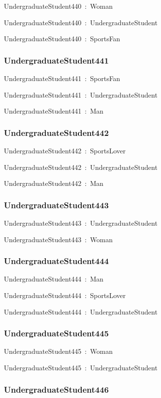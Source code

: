 \documentclass{article}
\begin{document}
UndergraduateStudent440~:~Woman

UndergraduateStudent440~:~UndergraduateStudent

UndergraduateStudent440~:~SportsFan

\subsubsection*{UndergraduateStudent441}

UndergraduateStudent441~:~SportsFan

UndergraduateStudent441~:~UndergraduateStudent

UndergraduateStudent441~:~Man

\subsubsection*{UndergraduateStudent442}

UndergraduateStudent442~:~SportsLover

UndergraduateStudent442~:~UndergraduateStudent

UndergraduateStudent442~:~Man

\subsubsection*{UndergraduateStudent443}

UndergraduateStudent443~:~UndergraduateStudent

UndergraduateStudent443~:~Woman

\subsubsection*{UndergraduateStudent444}

UndergraduateStudent444~:~Man

UndergraduateStudent444~:~SportsLover

UndergraduateStudent444~:~UndergraduateStudent

\subsubsection*{UndergraduateStudent445}

UndergraduateStudent445~:~Woman

UndergraduateStudent445~:~UndergraduateStudent

\subsubsection*{UndergraduateStudent446}
\end{document}
